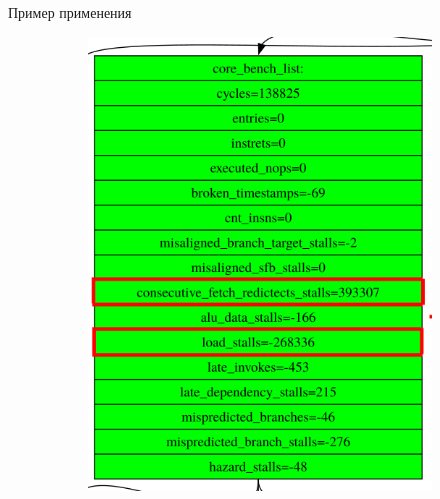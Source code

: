 \documentclass[10pt,aspectratio=169,hyperref={pdftex,unicode},xcolor=dvipsnames]{beamer}
\begin{document}
\begin{frame}{ Пример применения }
\begin{figure}
\begin{subfigure}{0.45\textwidth}
{                \includegraphics[height=0.7\textheight,keepaspectratio]{./images/stacd_diff_zoom.png}
            }
        \end{subfigure}
    \end{figure}

\end{frame}
\end{document}
